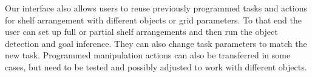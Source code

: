 


Our interface also allows users to reuse previously programmed tasks and actions for shelf arrangement with different objects or grid parameters.
To that end the user can set up full or partial shelf arrangements and then run the object detection and goal inference.
They can also change task parameters to match the new task.
Programmed manipulation actions can also be transferred in some cases, but need to be tested and possibly adjusted to work with different objects.


